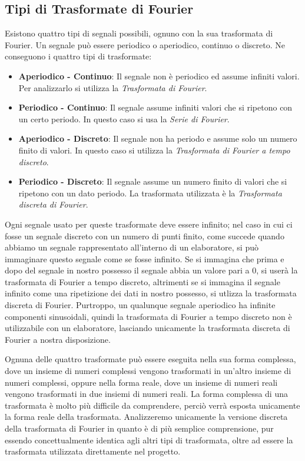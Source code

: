 \subsection{Tipi di Trasformate di Fourier}
Esistono quattro tipi di segnali possibili, ognuno con la sua trasformata di
Fourier. Un segnale pu\`o essere periodico o aperiodico, continuo o discreto. Ne
conseguono i quattro tipi di trasformate:
\begin{itemize}
	\item \textbf{Aperiodico - Continuo}: Il segnale non \`e periodico ed
		assume infiniti valori. Per analizzarlo si utilizza la \emph{Trasformata
		di Fourier}.
	\item \textbf{Periodico - Continuo}: Il segnale assume infiniti valori che
		si ripetono con un certo periodo. In questo caso si usa la \emph{Serie
		di Fourier}.
	\item \textbf{Aperiodico - Discreto}: Il segnale non ha periodo e assume
		solo un numero finito di valori. In questo caso si utilizza la
		\emph{Trasformata di Fourier a tempo discreto}.
	\item \textbf{Periodico - Discreto}: Il segnale assume un numero finito di
		valori che si ripetono con un dato periodo. La trasformata utilizzata
		\`e la \emph{Trasformata discreta di Fourier}.
\end{itemize}
Ogni segnale usato per queste trasformate deve essere infinito; nel caso in cui
ci fosse un segnale discreto con un numero di punti finito, come succede quando
abbiamo un segnale rappresentato all'interno di un elaboratore, si pu\`o
immaginare questo segnale come se fosse infinito. Se si immagina che prima e
dopo del segnale in nostro possesso il segnale abbia un valore pari a 0, si
user\`a la trasformata di Fourier a tempo discreto, altrimenti se si immagina il
segnale infinito come una ripetizione dei dati in nostro possesso, si utlizza la
trasformata discreta di Fourier. Purtroppo, un qualunque segnale aperiodico ha
infinite componenti sinusoidali, quindi la trasformata di Fourier a tempo
discreto non \`e utilizzabile con un elaboratore, lasciando unicamente la
trasformata discreta di Fourier a nostra disposizione.

Ognuna delle quattro trasformate pu\`o essere eseguita nella sua forma
complessa, dove un insieme di numeri complessi vengono trasformati in un'altro
insieme di numeri complessi, oppure nella forma reale, dove un insieme di numeri
reali vengono trasformati in due insiemi di numeri reali. La forma complessa
di una trasformata \`e molto pi\`u difficile da comprendere, perci\`o verr\`a
esposta unicamente la forma reale della trasformata. Analizzeremo unicamente la
versione discreta della trasformata di Fourier in quanto \`e di pi\`u
semplice comprensione, pur essendo concettualmente identica agli altri tipi di
trasformata, oltre ad essere la trasformata utilizzata direttamente nel
progetto.


